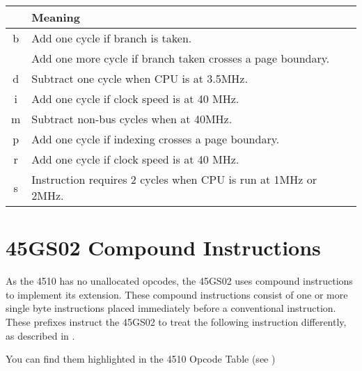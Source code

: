 \begin{center}
  \begin{tabular}{|p{2em}|l|}
  \cline{1-2}
    & {\bf Meaning} \\\hline
\multicolumn{1}{|c|}{b} & Add one cycle if branch is taken. \\
    & Add one more cycle if branch taken crosses a page boundary. \\\hline
\multicolumn{1}{|c|}{d} & Subtract one cycle when CPU is at 3.5MHz.  \\\hline
\multicolumn{1}{|c|}{i} & Add one cycle if clock speed is at 40 MHz. \\\hline
\multicolumn{1}{|c|}{m} & Subtract non-bus cycles when at 40MHz.  \\\hline
\multicolumn{1}{|c|}{p} & Add one cycle if indexing crosses a page boundary. \\\hline
\multicolumn{1}{|c|}{r} & Add one cycle if clock speed is at 40 MHz. \\\hline
\multicolumn{1}{|c|}{s} & Instruction requires 2 cycles when CPU is run at 1MHz or 2MHz. \\\hline
  \end{tabular}
\end{center}





\section{45GS02 Compound Instructions}

As the 4510 has no unallocated opcodes, the 45GS02 uses compound instructions
to implement its extension.  These compound instructions consist of one or
more single byte instructions placed immediately before a conventional
instruction.  These prefixes instruct the 45GS02 to treat the following instruction
differently, as described in .

You can find them highlighted in the 4510 Opcode Table (see )






\endgroup
